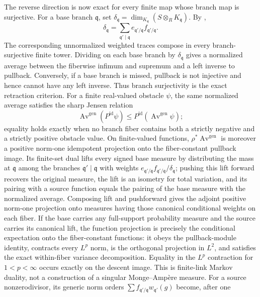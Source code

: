 The reverse direction is now exact for every finite map whose branch map is
surjective.  For a base branch \(\mathfrak q\), set
\(\delta_{\mathfrak q}=\dim_{K_{\mathfrak q}}
(S\otimes_RK_{\mathfrak q})\).  By
,
\[
 \delta_{\mathfrak q}
   =\sum_{\mathfrak q'\mid\mathfrak q}
      e_{\mathfrak q'/\mathfrak q}f_{\mathfrak q'/\mathfrak q}.
\]
The corresponding unnormalized weighted traces compose in every
branch-surjective finite tower.  Dividing on each base branch by
\(\delta_{\mathfrak q}\) gives a normalized average between the fiberwise
infimum and supremum and a left inverse to pullback.  Conversely, if a base
branch is missed, pullback is not injective and hence cannot have any left
inverse.  Thus branch surjectivity is the exact retraction criterion.  For a
finite real-valued obstacle \(\psi\), the same normalized average satisfies
the sharp Jensen relation
\[
 \operatorname{Av}^{\mathrm{gen}}(P^{\mathrm{id}}\psi)
   \leq P^{\mathrm{id}}(\operatorname{Av}^{\mathrm{gen}}\psi);
\]
equality holds exactly when no branch fiber contains both a strictly negative
and a strictly positive obstacle value.  On finite-valued functions,
\(\rho^*\operatorname{Av}^{\mathrm{gen}}\) is moreover a positive norm-one
idempotent projection onto the fiber-constant pullback image.  Its finite-set
dual lifts every signed base measure by distributing the mass at
\(\mathfrak q\) among the branches \(\mathfrak q'\mid\mathfrak q\) with
weights \(e_{\mathfrak q'/\mathfrak q}f_{\mathfrak q'/\mathfrak q}/
\delta_{\mathfrak q}\); pushing this lift forward recovers the original
measure, the lift is an isometry for total variation, and its pairing with a
source function equals the pairing of the base measure with the normalized
average.  Composing lift and pushforward gives the adjoint positive norm-one
projection onto measures having those canonical conditional weights on each
fiber.  If the base carries any full-support probability measure and the
source carries its canonical lift, the function projection is precisely the
conditional expectation onto the fiber-constant functions: it obeys the
pullback-module identity, contracts every \(L^p\) norm, is the orthogonal
projection in \(L^2\), and satisfies the exact within-fiber variance
decomposition.  Equality in the \(L^p\) contraction for
\(1<p<\infty\) occurs exactly on the descent image.  This is finite-link
Markov duality, not a construction of a singular Monge--Amp\`ere measure.  For a
source nonzerodivisor, its generic norm orders
\(\sum f_{\mathfrak q'/\mathfrak q}w_{\mathfrak q'}(g)\) become, after one
